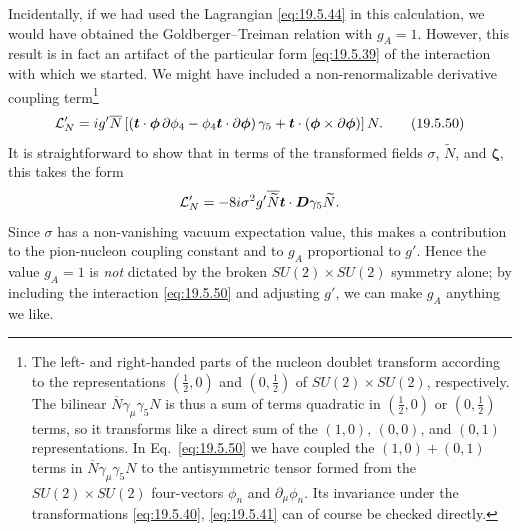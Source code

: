Incidentally, if we had used the Lagrangian \eqref{eq:19.5.44} in this calculation, we would have obtained the Goldberger--Treiman relation with $g_A=1$. However, this result is in fact an artifact of the particular form \eqref{eq:19.5.39} of the interaction with which we started. We might have included a non-renormalizable derivative coupling term\footnote{The left- and right-handed parts of the nucleon doublet transform according to the representations $(\tfrac12,0)$ and $(0,\tfrac12)$ of $SU(2)\times SU(2)$, respectively. The bilinear $\overline N\gamma_\mu\gamma_5N$ is thus a sum of terms quadratic in $(\tfrac12,0)$ or $(0,\tfrac12)$ terms, so it transforms like a direct sum of the $(1,0)$, $(0,0)$, and $(0,1)$ representations. In Eq.~\eqref{eq:19.5.50} we have coupled the $(1,0)+(0,1)$ terms in $\overline N\gamma_\mu\gamma_5N$ to the antisymmetric tensor formed from the $SU(2)\times SU(2)$ four-vectors $\phi_n$ and $\partial_\mu\phi_n$. Its invariance under the transformations \eqref{eq:19.5.40}, \eqref{eq:19.5.41} can of course be checked directly.}
\begin{equation}
\mathcal L'_N
=ig'\overline N
\left[
\left(
\boldsymbol t\cdot\boldsymbol{\phi}\,
\sl{\partial}\phi_4
-\phi_4\boldsymbol t\cdot
\sl{\partial}\boldsymbol{\phi}
\right)\gamma_5
+\boldsymbol t\cdot
(\boldsymbol{\phi}\times\sl{\partial}\boldsymbol{\phi})
\right]N.
\tag{19.5.50}\label{eq:19.5.50}
\end{equation}
It is straightforward to show that in terms of the transformed fields $\sigma$, $\widetilde N$, and $\boldsymbol{\zeta}$, this takes the form
\[
\mathcal L'_N
=-8i\sigma^2g'\overline{\widetilde N}
\boldsymbol t\cdot\sl{\boldsymbol D}\gamma_5\widetilde N.
\]
Since $\sigma$ has a non-vanishing vacuum expectation value, this makes a contribution to the pion-nucleon coupling constant and to $g_A$ proportional to $g'$. Hence the value $g_A=1$ is \emph{not} dictated by the broken $SU(2)\times SU(2)$ symmetry alone; by including the interaction \eqref{eq:19.5.50} and adjusting $g'$, we can make $g_A$ anything we like.

